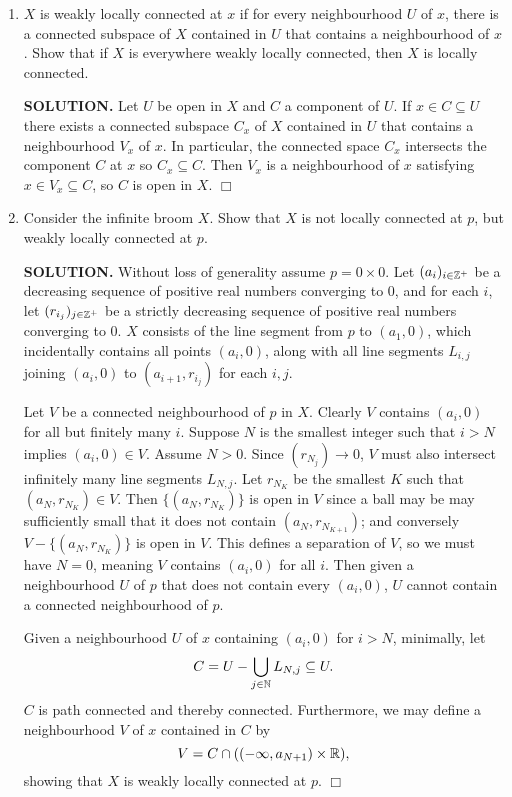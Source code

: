 \documentclass{article}
\begin{document}
\begin{enumerate}
    \item $X$ is weakly locally connected at $x$ if for every neighbourhood $U$ of $x$, there is a connected subspace of $X$ contained in $U$ that contains a neighbourhood of $x$. Show that if $X$ is everywhere weakly locally connected, then $X$ is locally connected.

    {\bf SOLUTION.} Let $U$ be open in $X$ and $C$ a component of $U$. If $x \in C \subseteq U$ there exists a connected subspace $C_x$ of $X$ contained in $U$ that contains a neighbourhood $V_x$ of $x$. In particular, the connected space $C_x$ intersects the component $C$ at $x$ so $C_x \subseteq C$. Then $V_x$ is a neighbourhood of $x$ satisfying $x \in V_x \subseteq C$, so $C$ is open in $X$. $\Box$

    \item Consider the infinite broom $X$. Show that $X$ is not locally connected at $p$, but weakly locally connected at $p$.

    {\bf SOLUTION.} Without loss of generality assume $p = 0 \times 0$. Let $(a_i)_{i \in \mathbb{Z}^+}$ be a decreasing sequence of positive real numbers converging to $0$, and for each $i$, let $(r_{i_j})_{j \in \mathbb{Z}^+}$ be a strictly decreasing sequence of positive real numbers converging to $0$. $X$ consists of the line segment from $p$ to $(a_1, 0)$, which incidentally contains all points $(a_i, 0)$, along with all line segments $L_{i, j}$ joining $(a_i, 0)$ to $(a_{i+1}, r_{i_j})$ for each $i,j$.

    Let $V$ be a connected neighbourhood of $p$ in $X$. Clearly $V$ contains $(a_i, 0)$ for all but finitely many $i$. Suppose $N$ is the smallest integer such that $i > N$ implies $(a_i, 0) \in V$. Assume $N > 0$. Since $(r_{N_j}) \rightarrow 0$, $V$ must also intersect infinitely many line segments $L_{N, j}$. Let $r_{N_K}$ be the smallest $K$ such that $(a_N, r_{N_K}) \in V$. Then $\{(a_N, r_{N_K})\}$ is open in $V$ since a ball may be may sufficiently small that it does not contain $(a_N, r_{N_{K+1}})$; and conversely $V - \{(a_N, r_{N_K})\}$ is open in $V$. This defines a separation of $V$, so we must have $N = 0$, meaning $V$ contains $(a_i, 0)$ for all $i$. Then given a neighbourhood $U$ of $p$ that does not contain every $(a_i, 0)$, $U$ cannot contain a connected neighbourhood of $p$.

    Given a neighbourhood $U$ of $x$ containing $(a_i, 0)$ for $i > N$, minimally, let 
    $$C = U - \bigcup_{j \in \mathbb{N}} L_{N, j} \subseteq U.$$
    $C$ is path connected and thereby connected. Furthermore, we may define a neighbourhood $V$ of $x$ contained in $C$ by 
    $$V = C \cap ((-\infty, a_{N+1}) \times \mathbb{R}),$$
    showing that $X$ is weakly locally connected at $p$. $\Box$


\end{enumerate}
\end{document}
